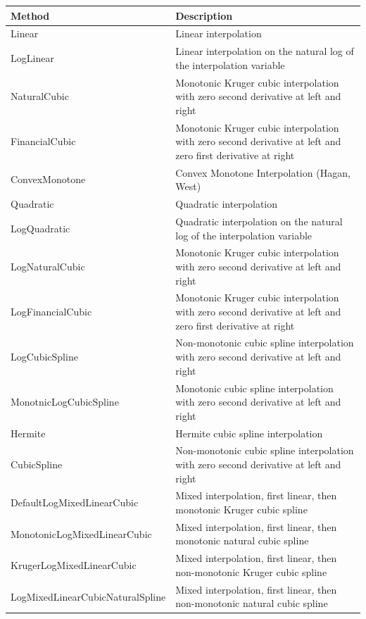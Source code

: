 \begin{table}[H]
\centering
\begin{tabular}{|l|p{9cm}|}
    \hline
    {\bfseries Method} & {\bfseries Description} \\
    \hline
    Linear & Linear interpolation \\ \hline
    LogLinear & Linear interpolation on the natural log of the interpolation variable \\ \hline
    NaturalCubic & Monotonic Kruger cubic interpolation with zero second derivative at left and right \\ \hline
    FinancialCubic & Monotonic Kruger cubic interpolation with zero second derivative at left and
                     zero first derivative at right \\ \hline
    ConvexMonotone & Convex Monotone Interpolation (Hagan, West) \\ \hline
    Quadratic & Quadratic interpolation \\ \hline
    LogQuadratic & Quadratic interpolation on the natural log of the interpolation variable \\ \hline
    LogNaturalCubic & Monotonic Kruger cubic interpolation with zero second derivative at left and right \\ \hline
    LogFinancialCubic & Monotonic Kruger cubic interpolation with zero second derivative at left and
                     zero first derivative at right \\ \hline
    LogCubicSpline & Non-monotonic cubic spline interpolation with zero second derivative at left and right \\ \hline
    MonotnicLogCubicSpline & Monotonic cubic spline interpolation with zero second derivative at left and right \\ \hline
    Hermite & Hermite cubic spline interpolation \\ \hline
    CubicSpline & Non-monotonic cubic spline interpolation with zero second derivative at left and right \\ \hline
    DefaultLogMixedLinearCubic & Mixed interpolation, first linear, then monotonic Kruger cubic spline \\ \hline
    MonotonicLogMixedLinearCubic & Mixed interpolation, first linear, then monotonic natural cubic spline \\ \hline
    KrugerLogMixedLinearCubic & Mixed interpolation, first linear, then non-monotonic Kruger cubic spline \\ \hline
    LogMixedLinearCubicNaturalSpline & Mixed interpolation, first linear, then non-monotonic natural cubic spline \\ \hline

\end{tabular}
\end{table}
